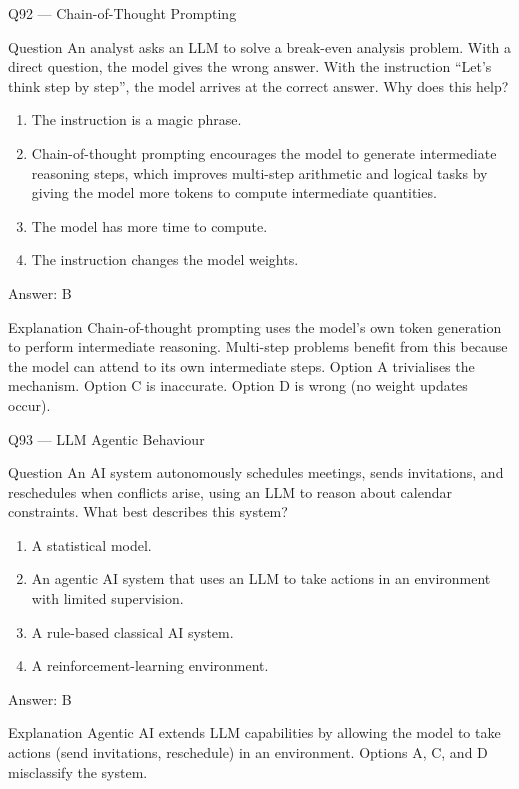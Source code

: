 \documentclass[aspectratio=169,8pt]{beamer}
\begin{document}
\begin{frame}{Q92 --- Chain-of-Thought Prompting}
\begin{block}{Question}
An analyst asks an LLM to solve a break-even analysis problem. With a direct question, the model gives the wrong answer. With the instruction ``Let's think step by step'', the model arrives at the correct answer. Why does this help?
\end{block}
\begin{enumerate}
\item The instruction is a magic phrase.
\item Chain-of-thought prompting encourages the model to generate intermediate reasoning steps, which improves multi-step arithmetic and logical tasks by giving the model more tokens to compute intermediate quantities.
\item The model has more time to compute.
\item The instruction changes the model weights.
\end{enumerate}
\begin{exampleblock}{Answer: B}\end{exampleblock}
\begin{block}{Explanation}
Chain-of-thought prompting uses the model's own token generation to perform intermediate reasoning. Multi-step problems benefit from this because the model can attend to its own intermediate steps. Option A trivialises the mechanism. Option C is inaccurate. Option D is wrong (no weight updates occur).
\end{block}
\end{frame}

\begin{frame}{Q93 --- LLM Agentic Behaviour}
\begin{block}{Question}
An AI system autonomously schedules meetings, sends invitations, and reschedules when conflicts arise, using an LLM to reason about calendar constraints. What best describes this system?
\end{block}
\begin{enumerate}
\item A statistical model.
\item An agentic AI system that uses an LLM to take actions in an environment with limited supervision.
\item A rule-based classical AI system.
\item A reinforcement-learning environment.
\end{enumerate}
\begin{exampleblock}{Answer: B}\end{exampleblock}
\begin{block}{Explanation}
Agentic AI extends LLM capabilities by allowing the model to take actions (send invitations, reschedule) in an environment. Options A, C, and D misclassify the system.
\end{block}
\end{frame}
\end{document}
